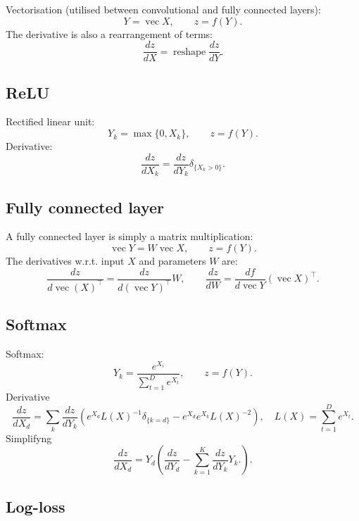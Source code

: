 \documentclass[12pt]{article}
\newcommand{\vv}{\operatorname{vec}}
\begin{document}
Vectorisation (utilised between convolutional and fully connected layers):
\[
 Y = \vv X, \qquad z = f(Y).
\]
The derivative is also a rearrangement of terms:
\[
\frac{dz}{dX} = \operatorname{reshape} \frac{dz}{dY}.
\]


\subsection{ReLU}\label{s:relu}

Rectified linear unit:
\[
 Y_k = \max\{0, X_k\}, \qquad z = f(Y).
\]
Derivative:
\[
\frac{dz}{dX_k}
=
\frac{dz}{dY_k} \delta_{\{X_k > 0 \}}.
\]

\subsection{Fully connected layer}\label{s:fully}

A fully connected layer is simply a matrix multiplication:
\[
  \vv Y = W \vv X, \qquad z = f(Y).
\]
The derivatives w.r.t. input $X$ and parameters $W$ are:
\[
\frac{dz}{d\vv(X)^\top}
= 
\frac{dz}{d(\vv Y)^\top} W,
\qquad
\frac{dz}{d W}
= 
\frac{df}{d \vv Y} (\vv X)^\top.
\]

\subsection{Softmax}\label{s:softmax}

Softmax:
\[
 Y_k = \frac{e^{X_i}}{\sum_{t=1}^D e^{X_t}}, \qquad z = f(Y).
\]
Derivative
\[
\frac{dz}{d X_d}
=
\sum_{k}
\frac{dz}{d Y_k}
\left(
e^{X_d} L(X)^{-1} \delta_{\{k=d\}}
-
e^{X_d}
e^{X_k} L(X)^{-2}
\right),
\quad
L(X) = \sum_{t=1}^D e^{X_t}.
\]
Simplifyng
\[
\frac{dz}{d X_d}
=
Y_d 
\left(
\frac{dz}{d Y_d}
-
\sum_{k=1}^K
\frac{dz}{d Y_k} Y_k.
\right).
\]

\subsection{Log-loss}\label{s:loss}
\end{document}
